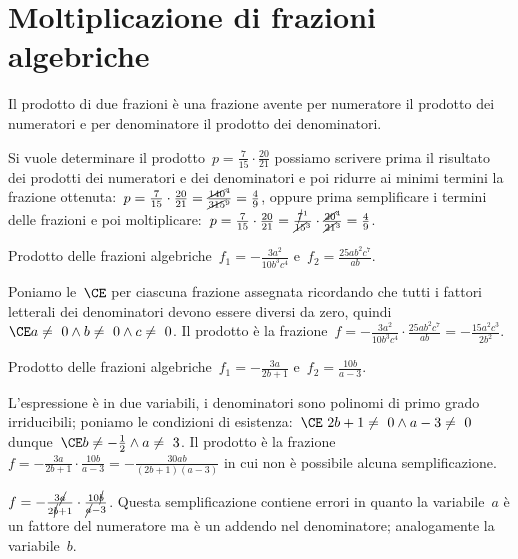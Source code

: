 

\section{Moltiplicazione di frazioni algebriche}
\label{sec:frazalg_moltiplicazione}

Il prodotto di due frazioni è una frazione avente per numeratore il prodotto 
dei numeratori e per denominatore il prodotto dei denominatori.

Si vuole determinare il prodotto~\(p=\frac{7}{15}\cdot \frac{20}{21}\) possiamo 
scrivere prima il risultato dei prodotti dei numeratori e dei denominatori e 
poi ridurre ai minimi termini la frazione
ottenuta:~\(p=\frac{7}{15}\cdot \frac{20}{21}=
\frac{\cancel{140}^4}{\cancel{315}^9}=\frac{4}{9}\),
oppure prima semplificare i termini delle frazioni e poi
moltiplicare:~\(p=\frac{7}{15}\cdot \frac{20}{21}=
\frac{\cancel{7}^1}{\cancel{15}^3}\cdot \frac{\cancel{20}^4}{\cancel{21}^3}=
\frac{4}{9}\).

 \begin{esempio}
Prodotto delle frazioni 
algebriche~\(f_{1}=-{\frac{3a^{2}}{10b^{3}c^{4}}}\) 
e~\(f_{2}=\frac{25ab^{2}c^{7}}{ab}\).

Poniamo le~\(\CE\) per ciascuna frazione assegnata ricordando che tutti i 
fattori letterali dei denominatori devono essere diversi da zero,
quindi~\(\CE a\neq~0\wedge b\neq~0\wedge c\neq~0\).
Il prodotto è la 
frazione~\(f=-{\frac{3a^{2}}{10b^{3}c^{4}}}\cdot\frac{25ab^{2}c^{7}}{ab}=
-{\frac{15a^{2}c^{3}}{2b^{2}}}\).
 \end{esempio}

 \begin{esempio}
Prodotto delle frazioni algebriche~\(f_{1}=-{\frac{3a}{2b+1}}\) 
e~\(f_{2}=\frac{10b}{a-3}\).

L'espressione è in due variabili, i denominatori sono polinomi di primo grado 
irriducibili; poniamo le condizioni di
esistenza:~\(\CE~2b+1\neq~0\wedge a-3\neq~0\) 
dunque~\(\CE b\neq -{\frac{1}{2}}\wedge a\neq~3\).
Il prodotto è la frazione~\(f=-{\frac{3a}{2b+1}}\cdot\frac{10b}{a-3}=
-{\frac{30ab}{(2b+1)(a-3)}}\) in cui non è possibile alcuna semplificazione.

\osservazione
\(f=-{\frac{3\cancel{a}}{2\cancel{b}+1}}\cdot\frac{10\cancel{b}}{\cancel{a}-3}\). 
Questa semplificazione contiene errori in quanto la variabile~\(a\) è un fattore 
del numeratore ma è un addendo nel denominatore; analogamente la variabile~\(b\).
 \end{esempio}

